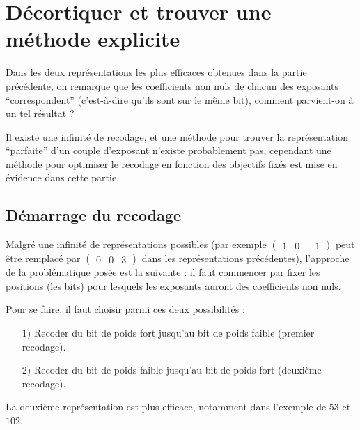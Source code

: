 \documentclass[12pt, a4paper]{memoir}
\begin{document}

\section{Décortiquer et trouver une méthode explicite}

  Dans les deux représentations les plus efficaces obtenues dans la partie précédente, on remarque que 
  les coefficients non nuls de chacun des exposants ``correspondent'' (c'est-à-dire qu'ils sont sur 
  le même bit), comment parvient-on à un tel résultat ? 
  
  Il existe une infinité de recodage, et une méthode pour trouver la représentation ``parfaite'' d'un couple
  d'exposant n'existe probablement pas, cependant une méthode pour optimiser le recodage en fonction des objectifs
  fixés est mise en évidence dans cette partie.

  \subsection{Démarrage du recodage}
  
  Malgré une infinité de représentations possibles (par exemple  $ \begin{pmatrix} 1 & 0 & -1 \end{pmatrix}$
  peut être remplacé par  $ \begin{pmatrix} 0 & 0 & 3 \end{pmatrix}$ dans les représentations précédentes), 
  l'approche de la problématique posée est la suivante : il faut commencer par fixer les positions 
  (les bits) pour lesquels les exposants auront des coefficients non nuls.

  Pour se faire, il faut choisir parmi ces deux possibilités :
  \begin{itemize}
   \item [$1)$] Recoder du bit de poids fort jusqu'au bit de poids faible (premier recodage).
   \item [$2)$] Recoder du bit de poids faible jusqu'au bit de poids fort (deuxième recodage).
   \end{itemize}

   La deuxième représentation est plus efficace, notamment dans l'exemple de $53$ et $102$.
   
\end{document}
